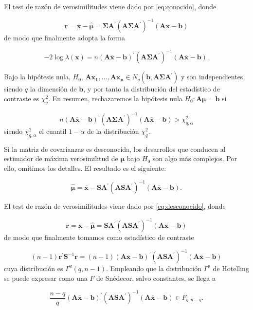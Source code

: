 \documentclass[
  a4paper,
  oneside]{scrbook}
\theoremstyle{definition}
\theoremstyle{definition}
\theoremstyle{definition}
\theoremstyle{definition}
\theoremstyle{remark}
\begin{document}
El test de razón de verosimilitudes viene dado por \eqref{eq:conocido}, donde

\[\bm{r}=\overline{\bm{x}}-\hat{\bm{\mu}}=\bm\Sigma \bm{A}^\prime{} \left(\bm{A}\bm\Sigma \bm{A}^\prime{}\right)^{-1}\left(\bm{A}\overline{\bm{x}}-\bm{b}\right)\]
de modo que finalmente adopta la forma

\[-2\log \lambda(\bm{x})=n\left(\bm{A}\overline{\bm{x}}-\bm{b}\right)^\prime{}
\left(\bm{A}\bm\Sigma \bm{A}^\prime{}\right)^{-1}\left(\bm{A}\overline{\bm{x}}-\bm{b}\right).\]

Bajo la hipótesis nula, \(H_0\),
\(\bm{A}\bm{x_1},\ldots,\bm{A}\bm{x_n}\in N_q(\bm{b},\bm{A}\bm\Sigma \bm{A}^\prime{})\)
y son independientes, siendo \(q\) la dimensión de \(\bm{b}\), y por tanto
la distribución del estadístico de contraste es \(\chi_q^2\). En resumen,
rechazaremos la hipótesis nula \(H_0: \bm{A}\bm{\mu}=\bm{b}\) si

\[n\left(\bm{A}\overline{\bm{x}}-\bm{b}\right)^\prime{}
\left(\bm{A}\bm\Sigma \bm{A}^\prime{}\right)^{-1}\left(\bm{A}\overline{\bm{x}}-\bm{b}\right)>\chi_{q,\alpha}^2\]
siendo \(\chi_{q,\alpha}^2\) el cuantil \(1-\alpha\) de la distribución
\(\chi_q^2\).

Si la matriz de covarianzas es desconocida, los desarrollos que conducen
al estimador de máxima verosimilitud de \(\bm{\mu}\) bajo \(H_0\) son algo
más complejos. Por ello, omitimos los detalles. El resultado es el
siguiente:

\[\hat{\bm{\mu}}=\overline{\bm{x}}- \bm{S} \bm{A}^\prime{} \left(\bm{A}\bm{S}\bm{A}^\prime{}\right)^{-1}\left(\bm{A}\overline{\bm{x}}-\bm{b}\right).\]

El test de razón de verosimilitudes viene dado por \eqref{eq:desconocido}, donde

\[\bm{r}=\overline{\bm{x}}-\hat{\bm{\mu}}=\bm{S}\bm{A}^\prime{} \left(\bm{A}\bm{S}\bm{A}^\prime{}\right)^{-1}\left(\bm{A}\overline{\bm{x}}-\bm{b}\right)\]
de modo que finalmente tomamos como estadístico de contraste

\[(n-1)\bm{r}^\prime{}\bm{S}^{-1}\bm{r}=(n-1)
\left(\bm{A}\overline{\bm{x}}-\bm{b}\right)^\prime{}
\left(\bm{A}\bm{S} \bm{A}^\prime{}\right)^{-1}\left(\bm{A}\overline{\bm{x}}-\bm{b}\right)\]
cuya distribución es \(\Gamma^2(q,n-1)\). Empleando que la distribución
\(\Gamma^2\) de Hotelling se puede expresar como una \(F\) de Snédecor,
salvo constantes, se llega a

\[\frac{n-q}{q}\left(\bm{A}\overline{\bm{x}}-\bm{b}\right)^\prime{}
\left(\bm{A}\bm{S}\bm{A}^\prime{}\right)^{-1}\left(\bm{A}\overline{\bm{x}}-\bm{b}\right)\in F_{q,n-q}.\]
\end{document}
